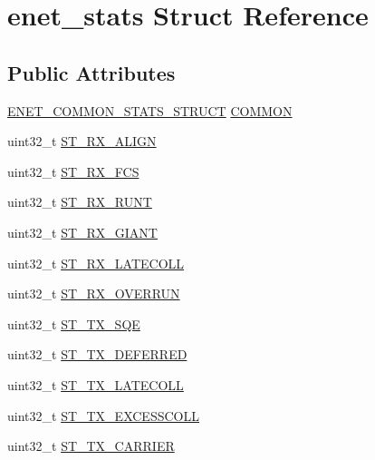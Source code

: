 \hypertarget{structenet__stats}{}\section{enet\+\_\+stats Struct Reference}
\label{structenet__stats}
\subsection*{Public Attributes}
\begin{DoxyCompactItemize}
\item 
\hyperlink{group__enet__rtcs__adaptor_ga14e03c6c977d2cd6771f2852d1b2db19}{E\+N\+E\+T\+\_\+\+C\+O\+M\+M\+O\+N\+\_\+\+S\+T\+A\+T\+S\+\_\+\+S\+T\+R\+U\+CT} \hyperlink{structenet__stats_a9c278adface04fc0c12b08a356a046cb}{C\+O\+M\+M\+ON}
\item 
uint32\+\_\+t \hyperlink{structenet__stats_a21eab2f405bdd72038d809bf54d4817f}{S\+T\+\_\+\+R\+X\+\_\+\+A\+L\+I\+GN}
\item 
uint32\+\_\+t \hyperlink{structenet__stats_ae6c33caa03ecfc10e6bc72f593fdf844}{S\+T\+\_\+\+R\+X\+\_\+\+F\+CS}
\item 
uint32\+\_\+t \hyperlink{structenet__stats_a20b995a40121512043a284277543a3e6}{S\+T\+\_\+\+R\+X\+\_\+\+R\+U\+NT}
\item 
uint32\+\_\+t \hyperlink{structenet__stats_ae8623cb8de996472d14f9f2ba3e687fc}{S\+T\+\_\+\+R\+X\+\_\+\+G\+I\+A\+NT}
\item 
uint32\+\_\+t \hyperlink{structenet__stats_aa3725b4386a8259a1ecbfeaf9c82e38e}{S\+T\+\_\+\+R\+X\+\_\+\+L\+A\+T\+E\+C\+O\+LL}
\item 
uint32\+\_\+t \hyperlink{structenet__stats_aa5ec4719f4e2b5b7e26234126f033c57}{S\+T\+\_\+\+R\+X\+\_\+\+O\+V\+E\+R\+R\+UN}
\item 
uint32\+\_\+t \hyperlink{structenet__stats_a127011cc7d1952f019381a27d750fde9}{S\+T\+\_\+\+T\+X\+\_\+\+S\+QE}
\item 
uint32\+\_\+t \hyperlink{structenet__stats_a482b8485a483b18d68215e021eb6971c}{S\+T\+\_\+\+T\+X\+\_\+\+D\+E\+F\+E\+R\+R\+ED}
\item 
uint32\+\_\+t \hyperlink{structenet__stats_ab54f2d47884902b90b42451f1cfd0e6a}{S\+T\+\_\+\+T\+X\+\_\+\+L\+A\+T\+E\+C\+O\+LL}
\item 
uint32\+\_\+t \hyperlink{structenet__stats_a1b2da4037cf958d933910e2ca3866adc}{S\+T\+\_\+\+T\+X\+\_\+\+E\+X\+C\+E\+S\+S\+C\+O\+LL}
\item 
uint32\+\_\+t \hyperlink{structenet__stats_a2c82b4c66a63cb517d0804cfe220ead1}{S\+T\+\_\+\+T\+X\+\_\+\+C\+A\+R\+R\+I\+ER}

\end{DoxyCompactItemize}
